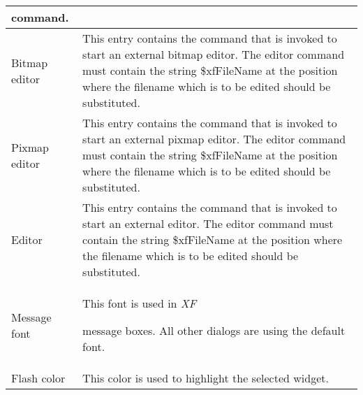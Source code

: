 {\begin{supertabular}{|l|p{6.5cm}|}
                               command.\\  \hline
Bitmap editor                & This entry contains the
                               command that is invoked to
                               start an external bitmap
                               editor. The editor command
                               must contain the string
                               \$xfFileName at the position
                               where the filename which is
                               to be edited should be
                               substituted.\\  \hline
Pixmap editor                & This entry contains the
                               command that is invoked to
                               start an external pixmap
                               editor. The editor command
                               must contain the string
                               \$xfFileName at the position
                               where the filename which is
                               to be edited should be
                               substituted.\\  \hline
Editor                       & This entry contains the
                               command that is invoked to
                               start an external editor. The
                               editor command must contain
                               the string \$xfFileName at
                               the position where the
                               filename which is to be
                               edited should be
                               substituted.\\  \hline
Message font                 & This font is used in {\em XF }

                               message boxes. All other
                               dialogs are using the default
                               font.\\  \hline
Flash color                  & This color is used to
                               highlight the selected
                               widget.\\
\end{supertabular}
}

{\newpage
\clearpage
\samepage \begin{figure}[hbt]
  \centerline{
  \epsfysize=4.7cm
  }

  \label{fig:The procedure XFProcOptionsInterpreter}
\end{figure}
}

